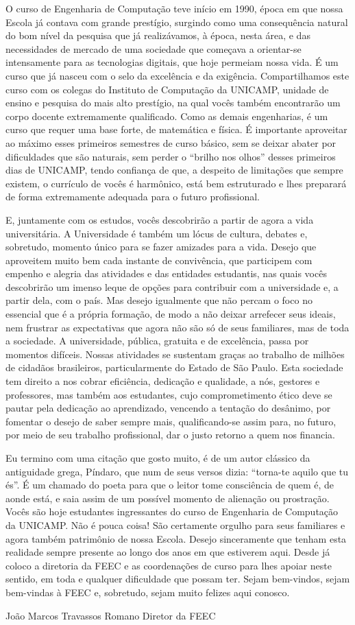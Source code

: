 O curso de Engenharia de Computação teve início em 1990, época em que nossa
Escola já contava com grande prestígio, surgindo como uma consequência natural
do bom nível da pesquisa que já realizávamos, à época, nesta área, e das
necessidades de mercado de uma sociedade que começava a orientar-se intensamente
para as tecnologias digitais, que hoje permeiam nossa vida. É um curso que já
nasceu com o selo da excelência e da exigência. Compartilhamos este curso com os
colegas do Instituto de Computação da UNICAMP, unidade de ensino e pesquisa do
mais alto prestígio, na qual vocês também encontrarão um corpo docente
extremamente qualificado. Como as demais engenharias, é um curso que requer uma
base forte, de matemática e física. É importante aproveitar ao máximo esses
primeiros semestres de curso básico, sem se deixar abater por dificuldades que
são naturais, sem perder o “brilho nos olhos” desses primeiros dias de UNICAMP,
tendo confiança de que, a despeito de limitações que sempre existem, o currículo
de vocês é harmônico, está bem estruturado e lhes preparará de forma
extremamente adequada para o futuro profissional.

E, juntamente com os estudos, vocês descobrirão a partir de agora a vida
universitária. A Universidade é também um lócus de cultura, debates e,
sobretudo, momento único para se fazer amizades para a vida. Desejo que
aproveitem muito bem cada instante de convivência, que participem com empenho e
alegria das atividades e das entidades estudantis, nas quais vocês descobrirão
um imenso leque de opções para contribuir com a universidade e, a partir dela,
com o país. Mas desejo igualmente que não percam o foco no essencial que é a
própria formação, de modo a não deixar arrefecer seus ideais, nem frustrar as
expectativas que agora não são só de seus familiares, mas de toda a sociedade.
A universidade, pública, gratuita e de excelência, passa por momentos difíceis.
Nossas atividades se sustentam graças ao trabalho de milhões de cidadãos
brasileiros, particularmente do Estado de São Paulo. Esta sociedade tem direito
a nos cobrar eficiência, dedicação e qualidade, a nós, gestores e professores,
mas também aos estudantes, cujo comprometimento ético deve se pautar pela
dedicação ao aprendizado, vencendo a tentação do desânimo, por fomentar o desejo
de saber sempre mais, qualificando-se assim para, no futuro, por meio de seu
trabalho profissional, dar o justo retorno a quem nos financia.

Eu termino com uma citação que gosto muito, é de um autor clássico da
antiguidade grega, Píndaro, que num de seus versos dizia: “torna-te aquilo que
tu és”. É um chamado do poeta para que o leitor tome consciência de quem é, de
aonde está, e saia assim de um possível momento de alienação ou prostração.
Vocês são hoje estudantes ingressantes do curso de Engenharia de Computação da
UNICAMP. Não é pouca coisa! São certamente orgulho para seus familiares e agora
também patrimônio de nossa Escola. Desejo sinceramente que tenham esta realidade
sempre presente ao longo dos anos em que estiverem aqui. Desde já coloco a
diretoria da FEEC e as coordenações de curso para lhes apoiar neste sentido, em
toda e qualquer dificuldade que possam ter. Sejam bem-vindos, sejam bem-vindas à
FEEC e, sobretudo, sejam muito felizes aqui conosco.

João Marcos Travassos Romano Diretor da FEEC
